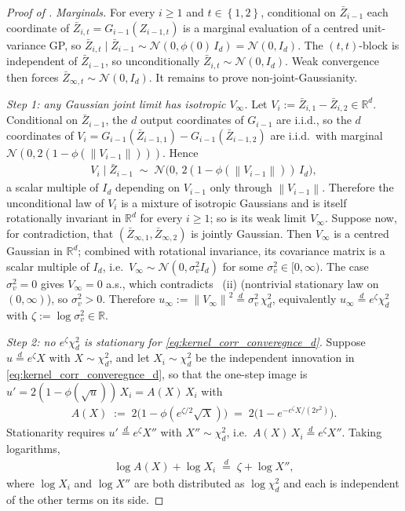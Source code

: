\documentclass{article}
\newcommand{\RR}{\mathbb{R}}
\newcommand{\Set}[1]{\left\{ #1 \right\}}
\newcommand{\norm}[1]{\left\|#1\right\|}
\newcommand{\cond}{\mid}
\newcommand{\mcN}{\mathcal{N}}
\newcommand{\bZ}{\bar{Z}}
\begin{document}
\begin{proof}[Proof of ]
  \emph{Marginals.} For every $i \ge 1$ and $t \in \Set{1, 2}$, conditional on $\bZ_{i-1}$ each coordinate of $\bZ_{i,t} = G_{i-1}(Z_{i-1,t})$ is a marginal evaluation of a centred unit-variance GP, so $\bZ_{i,t} \cond \bZ_{i-1} \sim \mcN(0, \phi(0)\, I_d) = \mcN(0, I_d)$. The $(t,t)$-block is independent of $\bZ_{i-1}$, so unconditionally $\bZ_{i,t} \sim \mcN(0, I_d)$. Weak convergence then forces $\bZ_{\infty, t} \sim \mcN(0, I_d)$. It remains to prove non-joint-Gaussianity.

  \emph{Step 1: any Gaussian joint limit has isotropic $V_\infty$.} Let $V_i := \bZ_{i,1} - \bZ_{i,2} \in \RR^d$. Conditional on $\bZ_{i-1}$, the $d$ output coordinates of $G_{i-1}$ are i.i.d., so the $d$ coordinates of $V_i = G_{i-1}(\bZ_{i-1,1}) - G_{i-1}(\bZ_{i-1,2})$ are i.i.d.\ with marginal $\mcN(0, 2(1 - \phi(\norm{V_{i-1}})))$. Hence
  \begin{eqnarray*}
    V_i \cond \bZ_{i-1} \;\sim\; \mcN\!\bigl(0,\, 2(1 - \phi(\norm{V_{i-1}}))\, I_d\bigr),
  \end{eqnarray*}
  a scalar multiple of $I_d$ depending on $V_{i-1}$ only through $\norm{V_{i-1}}$. Therefore the unconditional law of $V_i$ is a mixture of isotropic Gaussians and is itself rotationally invariant in $\RR^d$ for every $i \ge 1$; so is its weak limit $V_\infty$. Suppose now, for contradiction, that $(\bZ_{\infty,1}, \bZ_{\infty,2})$ is jointly Gaussian. Then $V_\infty$ is a centred Gaussian in $\RR^d$; combined with rotational invariance, its covariance matrix is a scalar multiple of $I_d$, i.e.\ $V_\infty \sim \mcN(0, \sigma_v^2 I_d)$ for some $\sigma_v^2 \in [0, \infty)$. The case $\sigma_v^2 = 0$ gives $V_\infty = 0$ a.s., which contradicts ~(ii) (nontrivial stationary law on $(0, \infty)$), so $\sigma_v^2 > 0$. Therefore $u_\infty := \norm{V_\infty}^2 \stackrel d= \sigma_v^2\, \chi^2_d$, equivalently $u_\infty \stackrel d= e^\zeta \chi^2_d$ with $\zeta := \log \sigma_v^2 \in \RR$.

  \emph{Step 2: no $e^\zeta \chi^2_d$ is stationary for \eqref{eq:kernel_corr_converegnce_d}.} Suppose $u \stackrel d= e^\zeta X$ with $X \sim \chi^2_d$, and let $X_i \sim \chi^2_d$ be the independent innovation in \eqref{eq:kernel_corr_converegnce_d}, so that the one-step image is $u' = 2(1 - \phi(\sqrt u))\, X_i = A(X)\, X_i$ with
  \begin{eqnarray*}
    A(X) \;:=\; 2\bigl(1 - \phi(e^{\zeta/2}\sqrt X)\bigr) \;=\; 2\bigl(1 - e^{-e^\zeta X / (2 r^2)}\bigr).
  \end{eqnarray*}
  Stationarity requires $u' \stackrel d= e^\zeta X''$ with $X'' \sim \chi^2_d$, i.e.\ $A(X)\, X_i \stackrel d= e^\zeta X''$. Taking logarithms,
  \begin{eqnarray}
    \label{eq:sync_gaussian_conv_id}
    \log A(X) + \log X_i \;\stackrel d=\; \zeta + \log X'',
  \end{eqnarray}
  where $\log X_i$ and $\log X''$ are both distributed as $\log \chi^2_d$ and each is independent of the other terms on its side.


\end{proof}
\end{document}
